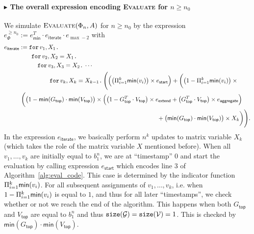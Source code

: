 \paragraph{$\blacktriangleright$ The overall expression encoding {\normalfont \textsc{Evaluate}} for $n\geq n_0$}
We simulate $\textsc{Evaluate}(\Phi_n,A)$ for $n\geq n_0$ by the expression
$e_{\Phi}^{\geq n_0}:= e_{\mathsf{min}}^T\cdot e_{\mathsf{iterate}}\cdot e_{\max -2}$ with
    \begin{align*}\allowdisplaybreaks
		e_{\mathsf{iterate}}&:= \ffor{v_1}{X_1} \\
		& \qquad\ffor{v_2}{X_2=X_1}  \\
		& \qquad \quad \ffor{v_3}{X_3=X_2}  \cdots\\
		& \qquad \qquad\quad \ffor{v_k}{X_{k}=X_{k-1}} \Biggl(\Bigl(\bigl( \sprod_{i=1}^k \mathsf{min}(v_i)\bigr) \times e_{\mathsf{start}}\Bigr) + 
        \biggl( \bigl(1- \sprod_{i=1}^k \mathsf{min}(v_i)\bigr)\times{}\\
        &\hspace{0.3em} \biggl( \bigl(1 -\mathsf{min}(G_{\mathsf{top}})\cdot \mathsf{min}(V_{\mathsf{top}})\bigr) \times \Bigl(\bigl( 1 - G_{\mathsf{top}}^T\cdot V_{\mathsf{top}}\bigr) \times e_{\mathsf{extend}} + 
        \bigl(G_{\mathsf{top}}^T\cdot V_{\mathsf{top}}\bigr) \times e_{\mathsf{aggregate}}\Bigl)  \\
        &\hspace{8cm}+\bigl(\mathsf{min}(G_{\mathsf{top}})\cdot \mathsf{min}(V_{\mathsf{top}})\bigr)\times X_k\biggr)\Biggr).
	   \end{align*}
In the expression $e_{\mathsf{iterate}}$, we basically perform $n^k$ updates to matrix variable $X_k$ (which takes the role of the matrix variable $X$ mentioned before).
When all $v_1,\ldots,v_k$ are initially equal to $b_1^n$, we are at ``timestamp'' $0$ and start the evaluation by 
calling expression $e_{\mathsf{start}}$ which encodes line 3 of  Algorithm~\ref{alg:eval_code}. This case is determined by the indicator function
$ \Pi_{i=1}^k \mathsf{min}(v_i)$. For all subsequent assignments of $v_1,\ldots,v_k$, i.e. when $1- \Pi_{i=1}^k \mathsf{min}(v_i)$ is equal to $1$, and thus for all later ``timestamps'', we check whether or not we reach the end of the algorithm. This happens when both $G_{\mathsf{top}}$ and $V_{\mathsf{top}}$ are equal to $b_1^n$
and thus $\texttt{size}(\mathcal{G})=\texttt{size}(\mathcal{V})=1$. This is checked by $\mathsf{min}(G_{\mathsf{top}})\cdot \mathsf{min}(V_{\mathsf{top}})$.
